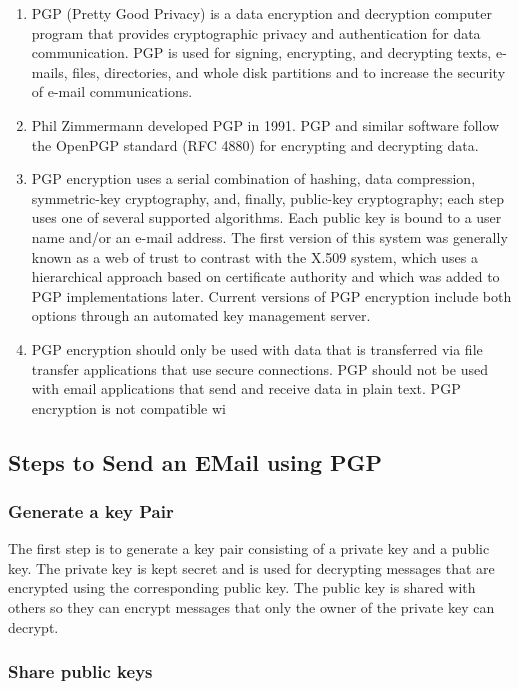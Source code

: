 \documentclass[openany]{book}
\begin{document}
\begin{enumerate}
    \item PGP (Pretty Good Privacy) is a data encryption and decryption computer program that provides cryptographic privacy and authentication for data communication. PGP is used for signing, encrypting, and decrypting texts, e-mails, files, directories, and whole disk partitions and to increase the security of e-mail communications.
    \item Phil Zimmermann developed PGP in 1991. PGP and similar software follow the OpenPGP standard (RFC 4880) for encrypting and decrypting data.
    \item PGP encryption uses a serial combination of hashing, data compression, symmetric-key cryptography, and, finally, public-key cryptography; each step uses one of several supported algorithms. Each public key is bound to a user name and/or an e-mail address. The first version of this system was generally known as a web of trust to contrast with the X.509 system, which uses a hierarchical approach based on certificate authority and which was added to PGP implementations later. Current versions of PGP encryption include both options through an automated key management server.
    \item PGP encryption should only be used with data that is transferred via file transfer applications that use secure connections. PGP should not be used with email applications that send and receive data in plain text. PGP encryption is not compatible wi    
\end{enumerate}

\subsection{Steps to Send an EMail using PGP}
\subsubsection{Generate a key Pair}

The first step is to generate a key pair consisting of a private key and a public key. The private key is kept secret and is used for decrypting messages that are encrypted using the corresponding public key. The public key is shared with others so they can encrypt messages that only the owner of the private key can decrypt.

\subsubsection{Share public keys}
\end{document}
